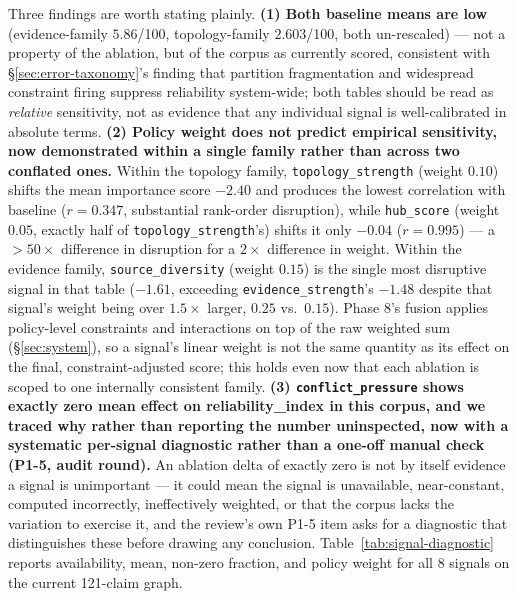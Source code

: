 Three findings are worth stating plainly. \textbf{(1) Both baseline means
are low} (evidence-family $5.86$/100, topology-family $2.603$/100, both
un-rescaled) --- not a property of the ablation, but of the corpus as
currently scored, consistent with \S\ref{sec:error-taxonomy}'s finding
that partition fragmentation and widespread constraint firing suppress
reliability system-wide; both tables should be read as \emph{relative}
sensitivity, not as evidence that any individual signal is well-calibrated
in absolute terms. \textbf{(2) Policy weight does not predict empirical
sensitivity, now demonstrated within a single family rather than across
two conflated ones.} Within the topology family, \texttt{topology\_strength}
(weight $0.10$) shifts the mean importance score $-2.40$ and produces the
lowest correlation with baseline ($r=0.347$, substantial rank-order
disruption), while \texttt{hub\_score} (weight $0.05$, exactly half of
\texttt{topology\_strength}'s) shifts it only $-0.04$ ($r=0.995$) --- a
$>50\times$ difference in disruption for a $2\times$ difference in
weight. Within the evidence family, \texttt{source\_diversity} (weight
$0.15$) is the single most
disruptive signal in that table ($-1.61$, exceeding \texttt{evidence\_strength}'s
$-1.48$ despite that signal's weight being over $1.5\times$ larger,
$0.25$ vs.\ $0.15$). Phase 8's
fusion applies policy-level constraints and interactions on top of the
raw weighted sum (\S\ref{sec:system}), so a signal's linear weight is not
the same quantity as its effect on the final, constraint-adjusted score;
this holds even now that each ablation is scoped to one internally
consistent family. \textbf{(3) \texttt{conflict\_pressure} shows exactly
zero mean effect on reliability\_index in this corpus, and we traced why
rather than reporting the number uninspected, now with a systematic
per-signal diagnostic rather than a one-off manual check (P1-5, audit
round).} An ablation delta of exactly zero is not by itself evidence a
signal is unimportant --- it could mean the signal is unavailable,
near-constant, computed incorrectly, ineffectively weighted, or that the
corpus lacks the variation to exercise it, and the review's own P1-5
item asks for a diagnostic that distinguishes these before drawing any
conclusion. Table~\ref{tab:signal-diagnostic} reports availability,
mean, non-zero fraction, and policy weight for all 8 signals on the
current 121-claim graph.



